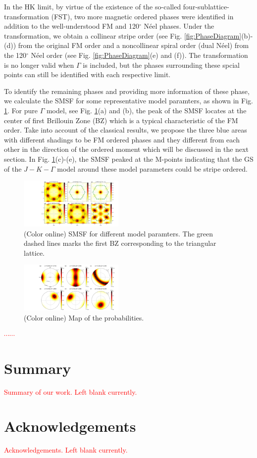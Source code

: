 \documentclass[aps,prb,reprint,groupedaddress,showpacs,amsfonts,amsmath,amssymb,superscriptaddress]{revtex4-1}
\begin{document}
In the HK limit, by virtue of the existence of the so-called four-sublattice-transformation (FST), two more magnetic ordered phases were identified in addition to the well-understood FM and 120$^\circ$ N\'{e}el phases. Under the transformation, we obtain a collinear stripe order (see Fig. \ref{fig:PhaseDiagram}(b)-(d)) from the original FM order and a noncollinear spiral order (dual N\'{e}el) from the 120$^\circ$ N\'{e}el order (see Fig. \ref{fig:PhaseDiagram}(e) and (f)). The transformation is no longer valid when $\Gamma$ is included, but the phases surrounding these spcial points can still be identified with each respective limit.

To identify the remaining phases and providing more information of these phase, we calculate the SMSF for some representative model paramters, as shown in Fig. \ref{fig:StructureFactors}. For pure $\Gamma$ model, see Fig. \ref{fig:StructureFactors}(a) and (b), the peak of the SMSF locates at the center of first Brillouin Zone (BZ) which is a typical characteristic of the FM order.
Take into account of the classical results, we propose the three blue areas with different shadings to be FM ordered phases and they different from each other in the direction of the ordered moment which will be discussed in the next section. In Fig. \ref{fig:StructureFactors}(c)-(e), the SMSF peaked at the M-points indicating that the GS of the $J-K-\Gamma$ model around these model parameters could be stripe ordered.

\begin{figure}
    \includegraphics[width=0.45\textwidth]{Fig3.pdf}
    \caption{(Color online) SMSF for different model paramters. The green dashed lines marks the first BZ corresponding to the triangular lattice.}
     \label{fig:StructureFactors}
\end{figure}

\begin{figure}
    \includegraphics[width=0.45\textwidth]{Fig4.pdf}
    \caption{(Color online) Map of the probabilities.}
     \label{fig:Proabilities}
\end{figure}

\textcolor{red}{$\cdots \cdots$}

\section{Summary}
\textcolor{red}{Summary of our work. Left blank currently.}

\section{Acknowledgements}
\textcolor{red}{Acknowledgements. Left blank currently.}


\end{document}
